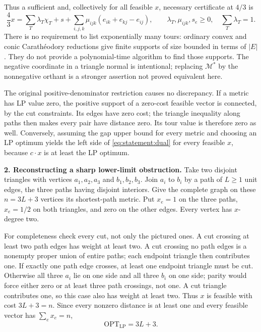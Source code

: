 \documentclass[11pt,a4paper]{article}
\numberwithin{equation}{section}
\begin{document}
Thus a sufficient and, collectively for all feasible $x$, necessary
certificate at $4/3$ is
\begin{equation}\label{eq:statement:certificate}
 \frac43 x=\sum_T\lambda_T\chi_T+s+
       \sum_{i,j,k}\mu_{ijk}(e_{ik}+e_{kj}-e_{ij}),
 \qquad
 \lambda_T,\mu_{ijk},s_e\ge0,\quad\sum_T\lambda_T=1.
\end{equation}
There is no requirement to list exponentially many tours: ordinary
convex and conic Carath\'eodory reductions give finite supports of
size bounded in terms of $|E|$. They do not provide a polynomial-time
algorithm to find those supports. The negative coordinate in a triangle
normal is intentional; replacing $\mathcal M^*$ by the nonnegative
orthant is a stronger assertion not proved equivalent here.

The original positive-denominator restriction causes no discrepancy.
If a metric has LP value zero, the positive support of a zero-cost
feasible vector is connected, by the cut constraints. Its edges have
zero cost; the triangle inequality along paths then makes every pair
have distance zero. Its tour value is therefore zero as well.
Conversely, assuming the gap upper bound for every metric and choosing
an LP optimum yields the left side of \eqref{eq:statement:dual} for every
feasible $x$, because $c\cdot x$ is at least the LP optimum.

\textbf{2. Reconstructing a sharp lower-limit obstruction.}
Take two disjoint triangles with vertices $a_1,a_2,a_3$ and
$b_1,b_2,b_3$. Join $a_i$ to $b_i$ by a path of $L\ge1$ unit edges,
the three paths having disjoint interiors. Give the complete graph on
these $n=3L+3$ vertices its shortest-path metric. Put $x_e=1$ on the
three paths, $x_e=1/2$ on both triangles, and zero on the other edges.
Every vertex has $x$-degree two.

For completeness check every cut, not only the pictured ones. A cut
crossing at least two path edges has weight at least two. A cut crossing
no path edges is a nonempty proper union of entire paths; each endpoint
triangle then contributes one. If exactly one path edge crosses, at
least one endpoint triangle must be cut. Otherwise all three $a_i$
lie on one side and all three $b_i$ on one side; parity would force
either zero or at least three path crossings, not one. A cut triangle
contributes one, so this case also has weight at least two.
Thus $x$ is feasible with cost $3L+3=n$. Since every nonzero distance
is at least one and every feasible vector has $\sum_e x_e=n$,
\begin{equation}\label{eq:statement:lowerlp}
                         \mathrm{OPT}_{\mathrm{LP}}=3L+3.
\end{equation}
\end{document}
